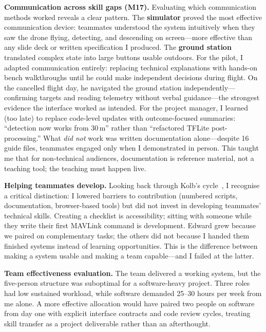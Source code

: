 \textbf{Communication across skill gaps (M17).} Evaluating which communication methods worked reveals a clear pattern. The \textbf{simulator} proved the most effective communication device: teammates understood the system intuitively when they saw the drone flying, detecting, and descending on screen---more effective than any slide deck or written specification I produced. The \textbf{ground station} translated complex state into large buttons usable outdoors. For the pilot, I adapted communication entirely: replacing technical explanations with hands-on bench walkthroughs until he could make independent decisions during flight. On the cancelled flight day, he navigated the ground station independently---confirming targets and reading telemetry without verbal guidance---the strongest evidence the interface worked as intended. For the project manager, I learned (too late) to replace code-level updates with outcome-focused summaries: ``detection now works from 30\,m'' rather than ``refactored TFLite post-processing.'' What \textit{did not} work was written documentation alone---despite 16 guide files, teammates engaged only when I demonstrated in person. This taught me that for non-technical audiences, documentation is reference material, not a teaching tool; the teaching must happen live.

\textbf{Helping teammates develop.} Looking back through Kolb's cycle~\cite{kolb1984}, I recognise a critical distinction: I lowered barriers to contribution (numbered scripts, documentation, browser-based tools) but did not invest in developing teammates' technical skills. Creating a checklist is accessibility; sitting with someone while they write their first MAVLink command is development. Edward grew because we paired on complementary tasks; the others did not because I handed them finished systems instead of learning opportunities. This is the difference between making a system usable and making a team capable---and I failed at the latter.

\textbf{Team effectiveness evaluation.} The team delivered a working system, but the five-person structure was suboptimal for a software-heavy project. Three roles had low sustained workload, while software demanded 25--30 hours per week from me alone. A more effective allocation would have paired two people on software from day one with explicit interface contracts and code review cycles, treating skill transfer as a project deliverable rather than an afterthought.
